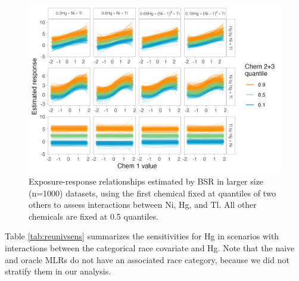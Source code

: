 \documentclass[12pt, twoside]{amherstthesis}
\begin{document}
\begin{figure}

{\centering \includegraphics[width=0.85\linewidth]{figures/ch4_slg_triv_expresp} 

}

\caption{Exposure-response relationships estimated by BSR in larger size (n=1000) datasets, using the first chemical fixed at quantiles of two others to assess interactions between Ni, Hg, and Tl. All other chemicals are fixed at 0.5 quantiles.}\label{fig:slgtri}
\end{figure}
Table \ref{tab:reunivsens} summarizes the sensitivities for Hg in scenarios with interactions between the categorical race covariate and Hg. Note that the naive and oracle MLRs do not have an associated race category, because we did not stratify them in our analysis.
\end{document}
